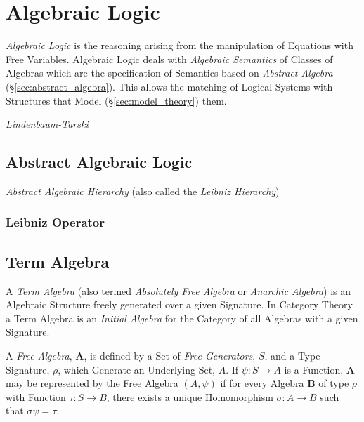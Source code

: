 \section{Algebraic Logic}

\emph{Algebraic Logic} is the reasoning arising from the manipulation
of Equations with Free Variables. Algebraic Logic deals with
\emph{Algebraic Semantics} of Classes of Algebras which are the
specification of Semantics based on \emph{Abstract Algebra}
(\S\ref{sec:abstract_algebra}). This allows the matching of Logical
Systems with Structures that Model (\S\ref{sec:model_theory}) them.


\emph{Lindenbaum-Tarski}


\subsection{Abstract Algebraic Logic}

\emph{Abstract Algebraic Hierarchy} (also called the \emph{Leibniz
  Hierarchy})



\subsubsection{Leibniz Operator}\label{subsec:leibniz_operator}



\subsection{Term Algebra}\label{subsec:term_algebra}

A \emph{Term Algebra} (also termed \emph{Absolutely Free Algebra} or
\emph{Anarchic Algebra}) is an Algebraic Structure freely generated
over a given Signature. In Category Theory a Term Algebra is an
\emph{Initial Algebra} for the Category of all Algebras with a given
Signature.

A \emph{Free Algebra}, $\mathbf{A}$, is defined by a Set of \emph{Free
  Generators}, $S$, and a Type Signature, $\rho$, which Generate an
Underlying Set, $A$. If $\psi : S \rightarrow A$ is a Function,
$\mathbf{A}$ may be represented by the Free Algebra $(A,\psi)$ if for
every Algebra $\mathbf{B}$ of type $\rho$ with Function $\tau : S
\rightarrow B$, there exists a unique Homomorphism $\sigma : A
\rightarrow B$ such that $\sigma\psi = \tau$.

